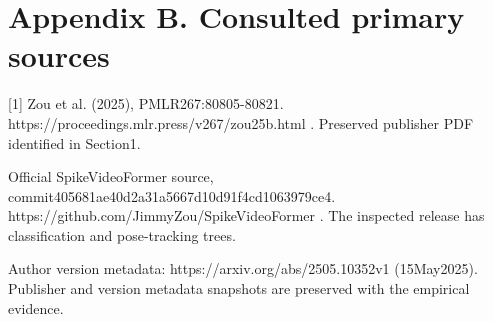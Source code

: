 \documentclass[10pt]{article}
\begin{document}
\section*{Appendix B. Consulted primary sources}
[1] Zou et al. (2025), PMLR267:80805-80821. https://proceedings.mlr.press/v267/zou25b.html . Preserved publisher PDF identified in Section1.\par
Official SpikeVideoFormer source, commit405681ae40d2a31a5667d10d91f4cd1063979ce4. https://github.com/JimmyZou/SpikeVideoFormer . The inspected release has classification and pose-tracking trees.\par
Author version metadata: https://arxiv.org/abs/2505.10352v1 (15May2025). Publisher and version metadata snapshots are preserved with the empirical evidence.\par
\end{document}
